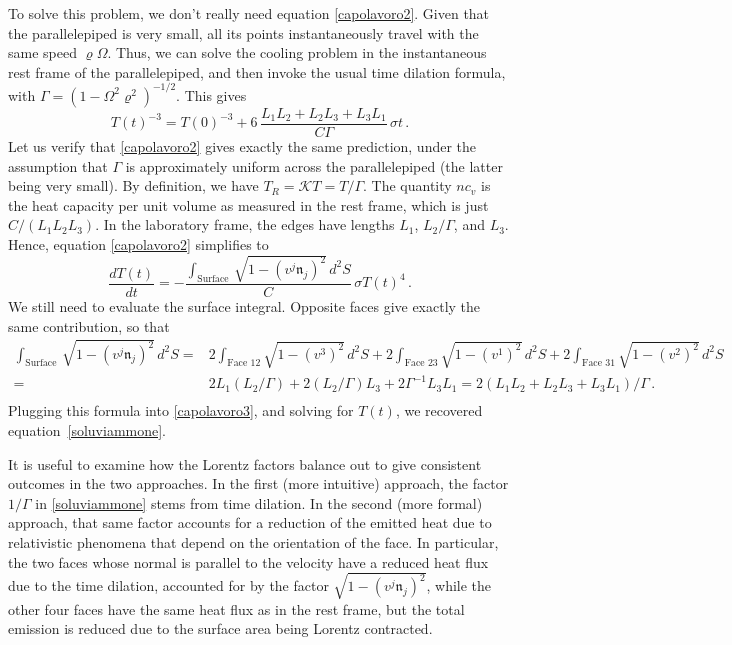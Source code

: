 \documentclass[a4paper, amsfonts, amssymb, amsmath, reprint, showkeys, nofootinbib, twoside, onecolumn,notitlepage]{revtex4-1}
\newcommand{\K}{{\mathcal{K}}}
\theoremstyle{definition}
\theoremstyle{theorem}
\begin{document}
To solve this problem, we don't really need equation \eqref{capolavoro2}. Given that the parallelepiped is very small, all its points instantaneously travel with the same speed $\varrho \Omega$. Thus, we can solve the cooling problem in the instantaneous rest frame of the parallelepiped, and then invoke the usual time dilation formula, with $\Gamma=(1{-}\Omega^2 \varrho^2)^{-1/2}$. This gives
\begin{equation}\label{soluviammone}
T(t)^{-3}=T(0)^{-3}+6 \,  \dfrac{L_1 L_2 {+} L_2 L_3 {+}L_3 L_1}{C\Gamma} \, \sigma t \, .  
\end{equation}
Let us verify that \eqref{capolavoro2} gives exactly the same prediction, under the assumption that $\Gamma$ is approximately uniform across the parallelepiped (the latter being very small). By definition, we have $T_R =\K T=T/\Gamma$. The quantity $nc_v$ is the heat capacity per unit volume as measured in the rest frame, which is just $C/(L_1L_2L_3)$. In the laboratory frame, the edges have lengths $L_1$, $L_2/\Gamma$, and $L_3$. Hence, equation \eqref{capolavoro2} simplifies to
\begin{equation}\label{capolavoro3}
\dfrac{dT(t)}{dt} =- \dfrac{\int_{\text{Surface}} \, \sqrt{1{-}(v^j \mathfrak{n}_j)^2} \, d^2 S}{C} \, \sigma T(t)^4 \,  .
\end{equation}
We still need to evaluate the surface integral. Opposite faces give exactly the same contribution, so that
\begin{equation}
\begin{split}
\int_{\text{Surface}} \, \sqrt{1{-}(v^j \mathfrak{n}_j)^2} \, d^2 S ={}& 2\int_{\text{Face }12} \!\! \! \!\! \! \!\! \! \!\! \!  \sqrt{1{-}(v^3)^2} \, d^2 S+2\int_{\text{Face }23} \!\! \! \!\! \! \!\! \! \!\! \! \sqrt{1{-}(v^1)^2} \, d^2 S+2\int_{\text{Face }31} \!\! \! \!\! \! \!\! \! \!\! \! \sqrt{1{-}(v^2)^2} \, d^2 S \\
={}& 2 L_1(L_2/\Gamma) +2 (L_2/\Gamma) L_3 + 2 \Gamma^{-1} L_3 L_1 =2(L_1L_2 +L_2 L_3 +L_3 L_1)/\Gamma \, .\\
\end{split}
\end{equation}
Plugging this formula into \eqref{capolavoro3}, and solving for $T(t)$, we recovered equation~\eqref{soluviammone}. 

It is useful to examine how the Lorentz factors balance out to give consistent outcomes in the two approaches. In the first (more intuitive) approach, the factor $1/\Gamma$ in \eqref{soluviammone} stems from time dilation. In the second (more formal) approach, that same factor accounts for a reduction of the emitted heat due to relativistic phenomena that depend on the orientation of the face. In particular, the two faces whose normal is parallel to the velocity have a reduced heat flux due to the time dilation, accounted for by the factor $\sqrt{1{-}(v^j \mathfrak{n}_j)^2}$, while the other four faces have the same heat flux as in the rest frame, but the total emission is reduced due to the surface area being Lorentz contracted. 
\end{document}

